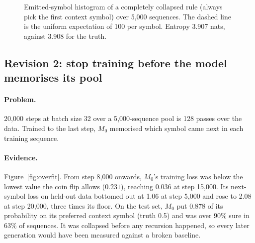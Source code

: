 \documentclass[11pt,a4paper]{article}
\begin{document}
\begin{figure}[htbp]
\centering
{}
\caption{Emitted-symbol histogram of a completely collapsed rule (always pick
the first context symbol) over 5{,}000 sequences. The dashed line is the
uniform expectation of 100 per symbol. Entropy 3.907 nats, against 3.908 for
the truth.}
\label{fig:hist}
\end{figure}

\subsection{Revision 2: stop training before the model memorises its pool}\label{sec:r2}
\paragraph{Problem.} 20{,}000 steps at batch size 32 over a 5{,}000-sequence
pool is 128 passes over the data. Trained to the last step, $M_0$ memorised
which symbol came next in each training sequence.
\paragraph{Evidence.} Figure~\ref{fig:overfit}. From step 8{,}000 onwards,
$M_0$'s training loss was below the lowest value the coin flip allows
($0.231$), reaching 0.036 at step 15{,}000. Its next-symbol loss on held-out
data bottomed out at 1.06 at step 5{,}000 and rose to 2.08 at step 20{,}000,
three times its floor. On the test set, $M_0$ put 0.878 of its probability on
its preferred context symbol (truth 0.5) and was over 90\% sure in 63\% of
sequences. It was collapsed before any recursion happened, so every later
generation would have been measured against a broken baseline.
\end{document}
